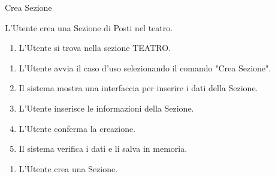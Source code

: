 {\ucTable	%
{	%
	Crea Sezione
	
}{	%
	
}{	%
	L'Utente crea una Sezione di Posti nel teatro.
	
}{	%
	\attori
	
}{	%
	\begin{enumerate}
        \item L'Utente si trova nella sezione TEATRO.
    \end{enumerate}
	
}{	%
	\begin{enumerate}
        \item L'Utente avvia il caso d'uso selezionando il comando "Crea Sezione".
        \item Il sistema mostra una interfaccia per inserire i dati della Sezione.
        \item L'Utente inserisce le informazioni della Sezione.
        \item L'Utente conferma la creazione.
        \item Il sistema verifica i dati e li salva in memoria.
    \end{enumerate}
	
}{	%
	\begin{enumerate}
        \item L'Utente crea una Sezione.
    \end{enumerate}
	
}{	%
} }



